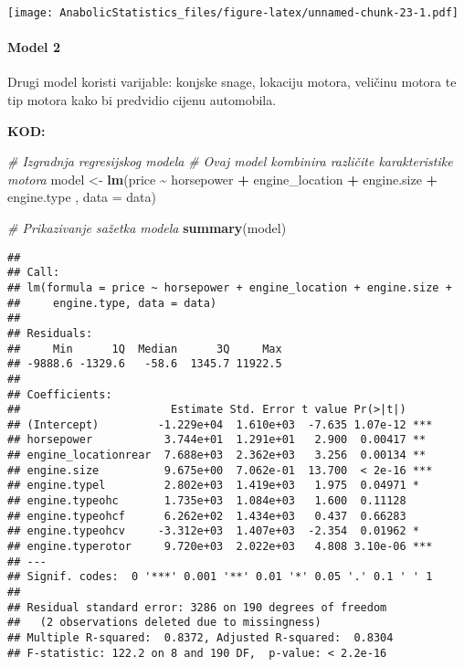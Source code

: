 \documentclass[
]{article}
\newenvironment{Shaded}{\begin{snugshade}}{\end{snugshade}}
\newcommand{\AttributeTok}[1]{\textcolor[rgb]{0.13,0.29,0.53}{#1}}
\newcommand{\CommentTok}[1]{\textcolor[rgb]{0.56,0.35,0.01}{\textit{#1}}}
\newcommand{\FunctionTok}[1]{\textcolor[rgb]{0.13,0.29,0.53}{\textbf{#1}}}
\newcommand{\NormalTok}[1]{#1}
\newcommand{\OtherTok}[1]{\textcolor[rgb]{0.56,0.35,0.01}{#1}}
\newcommand{\SpecialCharTok}[1]{\textcolor[rgb]{0.81,0.36,0.00}{\textbf{#1}}}
\begin{document}
\texttt{[image: AnabolicStatistics\_files/figure-latex/unnamed-chunk-23-1.pdf]}

\paragraph{Model 2}\label{model-2}

Drugi model koristi varijable: konjske snage, lokaciju motora, veličinu
motora te tip motora kako bi predvidio cijenu automobila.

\textbf{KOD:}

\begin{Shaded}
\begin{Highlighting}[]
\CommentTok{\# Izgradnja regresijskog modela}
\CommentTok{\# Ovaj model kombinira različite karakteristike motora}
\NormalTok{model }\OtherTok{\textless{}{-}} \FunctionTok{lm}\NormalTok{(price }\SpecialCharTok{\textasciitilde{}}\NormalTok{ horsepower }\SpecialCharTok{+}\NormalTok{ engine\_location }\SpecialCharTok{+}\NormalTok{ engine.size  }\SpecialCharTok{+}\NormalTok{ engine.type , }\AttributeTok{data =}\NormalTok{ data)}

\CommentTok{\# Prikazivanje sažetka modela}
\FunctionTok{summary}\NormalTok{(model)}
\end{Highlighting}
\end{Shaded}

\begin{verbatim}
## 
## Call:
## lm(formula = price ~ horsepower + engine_location + engine.size + 
##     engine.type, data = data)
## 
## Residuals:
##     Min      1Q  Median      3Q     Max 
## -9888.6 -1329.6   -58.6  1345.7 11922.5 
## 
## Coefficients:
##                       Estimate Std. Error t value Pr(>|t|)    
## (Intercept)         -1.229e+04  1.610e+03  -7.635 1.07e-12 ***
## horsepower           3.744e+01  1.291e+01   2.900  0.00417 ** 
## engine_locationrear  7.688e+03  2.362e+03   3.256  0.00134 ** 
## engine.size          9.675e+00  7.062e-01  13.700  < 2e-16 ***
## engine.typel         2.802e+03  1.419e+03   1.975  0.04971 *  
## engine.typeohc       1.735e+03  1.084e+03   1.600  0.11128    
## engine.typeohcf      6.262e+02  1.434e+03   0.437  0.66283    
## engine.typeohcv     -3.312e+03  1.407e+03  -2.354  0.01962 *  
## engine.typerotor     9.720e+03  2.022e+03   4.808 3.10e-06 ***
## ---
## Signif. codes:  0 '***' 0.001 '**' 0.01 '*' 0.05 '.' 0.1 ' ' 1
## 
## Residual standard error: 3286 on 190 degrees of freedom
##   (2 observations deleted due to missingness)
## Multiple R-squared:  0.8372, Adjusted R-squared:  0.8304 
## F-statistic: 122.2 on 8 and 190 DF,  p-value: < 2.2e-16
\end{verbatim}
\end{document}
